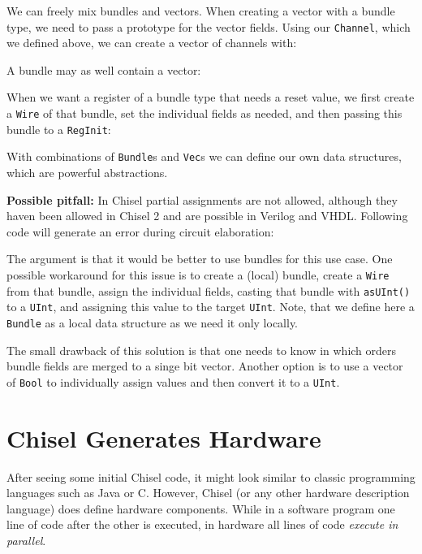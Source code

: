 \documentclass[%
    10pt,
    headinclude, footexclude,
    openright, %
    notitlepage,
    cleardoubleempty,
    headsepline,
    pointlessnumbers,
    bibtotoc, idxtotoc,
    ]{scrbook}
\newcommand{\code}[1]{{\small{\texttt{#1}}}}
\begin{document}
We can freely mix bundles and vectors. When creating a vector with a bundle
type, we need to pass a prototype for the vector fields. Using our
\code{Channel}, which we defined above, we can create a vector of channels with:


\noindent A bundle may as well contain a vector:


When we want a register of a bundle type that needs a reset value,
we first create a \code{Wire} of that bundle, set the individual fields
as needed, and then passing this bundle to a \code{RegInit}:


With combinations of \code{Bundle}s and \code{Vec}s we can define our own data
structures, which are powerful abstractions.

{\bf Possible pitfall:} In Chisel partial assignments are not allowed, although they haven been
allowed in Chisel 2 and are possible in Verilog and VHDL. Following code will generate
an error during circuit elaboration:


\noindent The argument is that it would be better to use bundles for this use case.
One possible workaround for this issue is to create a (local) bundle, create a \code{Wire}
from that bundle, assign the individual fields, casting that bundle with \code{asUInt()}
to a \code{UInt}, and assigning this value to the target \code{UInt}.
Note, that we define here a \code{Bundle} as a local data structure as we need it only
locally.


\noindent The small drawback of this solution is that one needs to know in which orders
bundle fields are merged to a singe bit vector. Another option is to use a vector of \code{Bool}
to individually assign values and then convert it to a \code{UInt}.


\section{Chisel Generates Hardware}

After seeing some initial Chisel code, it might look similar to classic programming
languages such as Java or C. However, Chisel (or any other hardware description
language) does define hardware components. While in a software program one
line of code after the other is executed, in hardware all lines of code
\emph{execute in parallel}.
\end{document}
